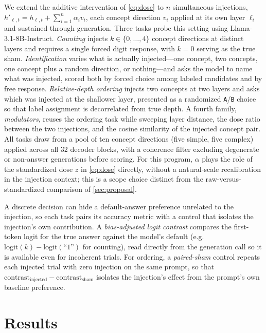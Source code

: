 We extend the additive intervention of \cref{eq:dose} to $n$ simultaneous injections, $h'_{\ell,t}=h_{\ell,t}+\sum_{i=1}^{n}\alpha_i v_i$, each concept direction $v_i$ applied at its own layer $\ell_i$ and sustained through generation.
Three tasks probe this setting using Llama-3.1-8B-Instruct.
\emph{Counting} injects $k\in\{0,\dots,4\}$ concept directions at distinct layers and requires a single forced digit response, with $k{=}0$ serving as the true sham.
\emph{Identification} varies what is actually injected---one concept, two concepts, one concept plus a random direction, or nothing---and asks the model to name what was injected, scored both by forced choice among labeled candidates and by free response.
\emph{Relative-depth ordering} injects two concepts at two layers and asks which was injected at the shallower layer, presented as a randomized \texttt{A}/\texttt{B} choice so that label assignment is decorrelated from true depth.
A fourth family, \emph{modulators}, reuses the ordering task while sweeping layer distance, the dose ratio between the two injections, and the cosine similarity of the injected concept pair.
All tasks draw from a pool of ten concept directions (five simple, five complex) applied across all 32 decoder blocks, with a coherence filter excluding degenerate or non-answer generations before scoring.
For this program, $\alpha$ plays the role of the standardized dose $z$ in \cref{eq:dose} directly, without a natural-scale recalibration in the injection context; this is a scope choice distinct from the raw-versus-standardized comparison of \cref{sec:proposal}.

A discrete decision can hide a default-answer preference unrelated to the injection, so each task pairs its accuracy metric with a control that isolates the injection's own contribution.
A \emph{bias-adjusted logit contrast} compares the first-token logit for the true answer against the model's default (e.g.\ $\mathrm{logit}(k)-\mathrm{logit}(\text{``1''})$ for counting), read directly from the generation call so it is available even for incoherent trials.
For ordering, a \emph{paired-sham} control repeats each injected trial with zero injection on the same prompt, so that $\text{contrast}_{\text{injected}}-\text{contrast}_{\text{sham}}$ isolates the injection's effect from the prompt's own baseline preference.

\section{Results}
\label{sec:results}

